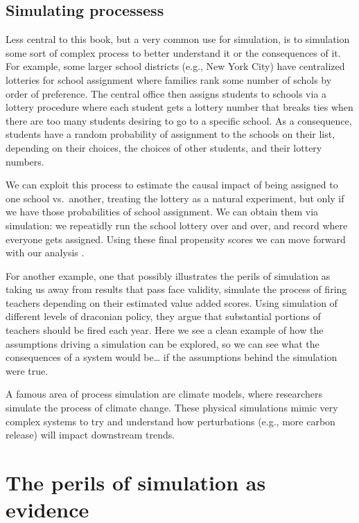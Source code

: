\documentclass[
]{book}
\begin{document}
\hypertarget{simulating-processess}{%
\subsection{Simulating processess}\label{simulating-processess}}

Less central to this book, but a very common use for simulation, is to simulation some sort of complex process to better understand it or the consequences of it.
For example, some larger school districts (e.g., New York City) have centralized lotteries for school assignment where families rank some number of schols by order of preference.
The central office then assigns students to schools via a lottery procedure where each student gets a lottery number that breaks ties when there are too many students desiring to go to a specific school.
As a consequence, students have a random probability of assignment to the schools on their list, depending on their choices, the choices of other students, and their lottery numbers.

We can exploit this process to estimate the causal impact of being assigned to one school vs.~another, treating the lottery as a natural experiment, but only if we have those probabilities of school assignment.
We can obtain them via simulation: we repeatidly run the school lottery over and over, and record where everyone gets assigned.
Using these final propensity scores we can move forward with our analysis \citep{abdulkadirouglu2017research}.

For another example, one that possibly illustrates the perils of simulation as taking us away from results that pass face validity, \citet{staiger2010searching} simulate the process of firing teachers depending on their estimated value added scores.
Using simulation of different levels of draconian policy, they argue that substantial portions of teachers should be fired each year.
Here we see a clean example of how the assumptions driving a simulation can be explored, so we can see what the consequences of a system would be\ldots{} if the assumptions behind the simulation were true.

A famous area of process simulation are climate models, where researchers simulate the process of climate change.
These physical simulations mimic very complex systems to try and understand how perturbations (e.g., more carbon release) will impact downstream trends.

\hypertarget{the-perils-of-simulation-as-evidence}{%
\section{The perils of simulation as evidence}\label{the-perils-of-simulation-as-evidence}}
\end{document}
